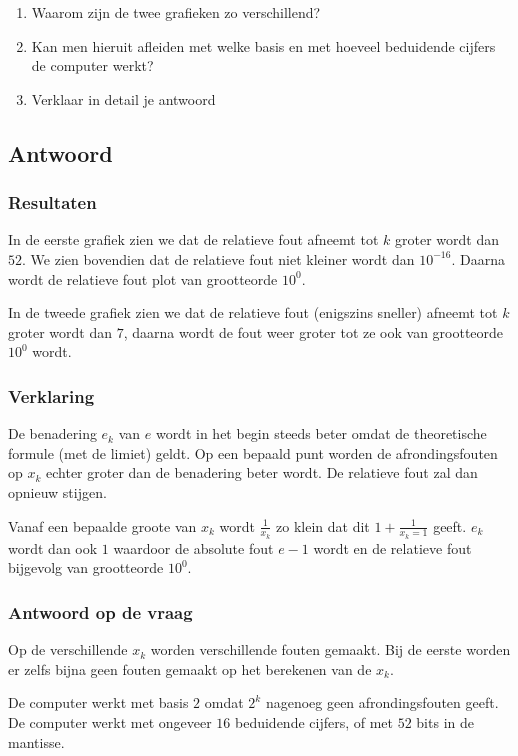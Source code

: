 \documentclass[examenvragen.tex]{subfiles}
\begin{document}
\begin{enumerate}
\item Waarom zijn de twee grafieken zo verschillend?
\item Kan men hieruit afleiden met welke basis en met hoeveel beduidende cijfers de computer werkt?
\item Verklaar in detail je antwoord
\end{enumerate}

\subsection{Antwoord}
\subsubsection{Resultaten}
In de eerste grafiek zien we dat de relatieve fout afneemt tot $k$ groter wordt dan $52$. We zien bovendien dat de relatieve fout niet kleiner wordt dan $10^{-16}$. Daarna wordt de relatieve fout plot van grootteorde $10^{0}$.

In de tweede grafiek zien we dat de relatieve fout (enigszins sneller) afneemt tot $k$ groter wordt dan $7$, daarna wordt de fout weer groter tot ze ook van grootteorde $10^{0}$ wordt.

\subsubsection{Verklaring}
De benadering $e_k$ van $e$ wordt in het begin steeds beter omdat de theoretische formule (met de limiet) geldt. Op een bepaald punt worden de afrondingsfouten op $x_k$ echter groter dan de benadering beter wordt. De relatieve fout zal dan opnieuw stijgen.

Vanaf een bepaalde groote van $x_k$ wordt $\frac{1}{x_k}$ zo klein dat dit $1 + \frac{1}{x_k = 1}$ geeft. $e_k$ wordt dan ook $1$ waardoor de absolute fout $e - 1$ wordt en de relatieve fout bijgevolg van grootteorde $10^{0}$.

\subsubsection{Antwoord op de vraag}
Op de verschillende $x_k$ worden verschillende fouten gemaakt. Bij de eerste worden er zelfs bijna geen fouten gemaakt op het berekenen van de $x_k$.

De computer werkt met basis $2$ omdat $2^k$ nagenoeg geen afrondingsfouten geeft. De computer werkt met ongeveer $16$ beduidende cijfers, of met $52$ bits in de mantisse.
\end{document}
